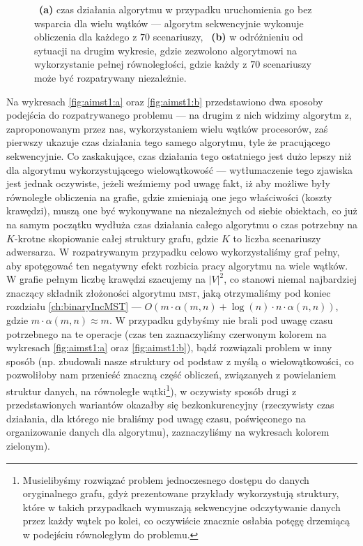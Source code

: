 \begin{figure}[!htbp]
{		~\textbf{(a)} czas działania algorytmu w przypadku uruchomienia go bez wsparcia dla wielu wątków --- algorytm sekwencyjnie wykonuje obliczenia dla każdego z $70$ scenariuszy,
		~\textbf{(b)} w odróżnieniu od sytuacji na drugim wykresie, gdzie zezwolono algorytmowi na wykorzystanie pełnej równoległości, gdzie każdy z $70$ scenariuszy może być rozpatrywany niezależnie.
	}
	\label{fig:aimst1}
\end{figure}

Na wykresach \ref{fig:aimst1:a} oraz \ref{fig:aimst1:b} przedstawiono dwa sposoby podejścia do rozpatrywanego problemu --- na drugim z nich widzimy algorytm z, zaproponowanym przez nas, wykorzystaniem wielu wątków procesorów, zaś pierwszy ukazuje czas działania tego samego algorytmu, tyle że pracującego sekwencyjnie. Co zaskakujące, czas działania tego ostatniego jest dużo lepszy niż dla algorytmu wykorzystującego wielowątkowość --- wytłumaczenie tego zjawiska jest jednak oczywiste, jeżeli weźmiemy pod uwagę fakt, iż aby możliwe były równoległe obliczenia na grafie, gdzie zmieniają one jego właściwości (koszty krawędzi), muszą one być wykonywane na niezależnych od siebie obiektach, co już na samym początku wydłuża czas działania całego algorytmu o czas potrzebny na $K$-krotne skopiowanie całej struktury grafu, gdzie $K$ to liczba scenariuszy adwersarza. W rozpatrywanym przypadku celowo wykorzystaliśmy graf pełny, aby spotęgować ten negatywny efekt rozbicia pracy algorytmu na wiele wątków. W grafie pełnym liczbę krawędzi szacujemy na $\left| V \right|^{2}$, co stanowi niemal najbardziej znaczący składnik złożoności algorytmu \textsc{imst}, jaką otrzymaliśmy pod koniec rozdziału \ref{ch:binaryIncMST} --- $O \left( m \cdot \alpha  \left( m, n \right) + \log \left( n \right) \cdot n \cdot \alpha \left( n, n \right) \right)$, gdzie $m \cdot \alpha  \left( m, n \right) \approx m$. W przypadku gdybyśmy nie brali pod uwagę czasu potrzebnego na te operacje (czas ten zaznaczyliśmy czerwonym kolorem na wykresach \ref{fig:aimst1:a} oraz \ref{fig:aimst1:b}), bądź rozwiązali problem w inny sposób (np. zbudowali nasze struktury od podstaw z myślą o wielowątkowości, co pozwoliłoby nam przenieść znaczną część obliczeń, związanych z powielaniem struktur danych, na równoległe wątki\footnote{Musielibyśmy rozwiązać problem jednoczesnego dostępu do danych oryginalnego grafu, gdyż prezentowane przykłady wykorzystują struktury, które w takich przypadkach wymuszają sekwencyjne odczytywanie danych przez każdy wątek po kolei, co oczywiście znacznie osłabia potęgę drzemiącą w podejściu równoległym do problemu.}), w oczywisty sposób drugi z przedstawionych wariantów okazałby się bezkonkurencyjny (rzeczywisty czas działania, dla którego nie braliśmy pod uwagę czasu, poświęconego na organizowanie danych dla algorytmu), zaznaczyliśmy na wykresach kolorem zielonym).

